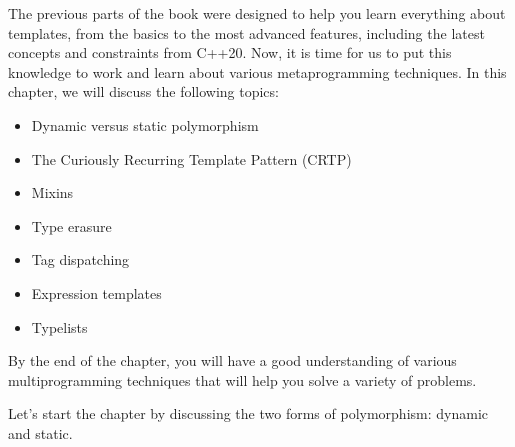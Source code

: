 
The previous parts of the book were designed to help you learn everything about templates, from the basics to the most advanced features, including the latest concepts and constraints from C++20. Now, it is time for us to put this knowledge to work and learn about various metaprogramming techniques. In this chapter, we will discuss the following topics:

\begin{itemize}
\item
Dynamic versus static polymorphism

\item
The Curiously Recurring Template Pattern (CRTP)

\item
Mixins

\item
Type erasure

\item
Tag dispatching

\item
Expression templates

\item
Typelists
\end{itemize}

By the end of the chapter, you will have a good understanding of various multiprogramming techniques that will help you solve a variety of problems.

Let’s start the chapter by discussing the two forms of polymorphism: dynamic and static.